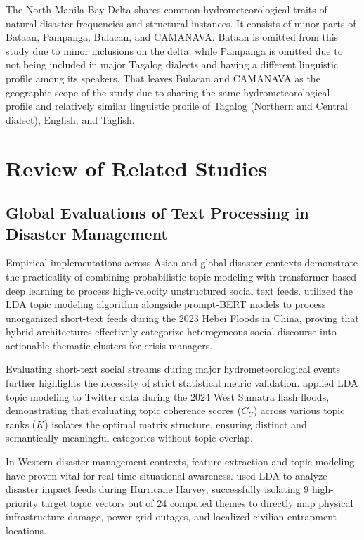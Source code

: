 The North Manila Bay Delta shares common hydrometeorological traits of natural disaster frequencies and structural instances. It consists of minor parts of Bataan, Pampanga, Bulacan, and CAMANAVA. Bataan is omitted from this study due to minor inclusions on the delta; while Pampanga is omitted due to not being included in major Tagalog dialects and having a different linguistic profile among its speakers. That leaves Bulacan and CAMANAVA as the geographic scope of the study due to sharing the same hydrometeorological profile and relatively similar linguistic profile of Tagalog (Northern and Central dialect), English, and Taglish.

\section*{Review of Related Studies}

\subsection*{Global Evaluations of Text Processing in Disaster Management}

Empirical implementations across Asian and global disaster contexts demonstrate
the practicality of combining probabilistic topic modeling with
transformer-based deep learning to process high-velocity unstructured social
text feeds. \textcite{zang2026} utilized the LDA topic modeling algorithm
alongside prompt-BERT models to process unorganized short-text feeds during the
2023 Hebei Floods in China, proving that hybrid architectures effectively
categorize heterogeneous social discourse into actionable thematic clusters for
crisis managers.

Evaluating short-text social streams during major hydrometeorological events
further highlights the necessity of strict statistical metric validation.
\textcite{anggara2025} applied LDA topic modeling to Twitter data during the 2024
West Sumatra flash floods, demonstrating that evaluating topic coherence
scores ($C_U$) across various topic ranks ($K$) isolates the optimal matrix
structure, ensuring distinct and semantically meaningful categories without
topic overlap.

In Western disaster management contexts, feature extraction and topic modeling
have proven vital for real-time situational awareness. \textcite{mihunov2022} used
LDA to analyze disaster impact feeds during Hurricane Harvey, successfully
isolating 9 high-priority target topic vectors out of 24 computed themes to
directly map physical infrastructure damage, power grid outages, and localized
civilian entrapment locations.

